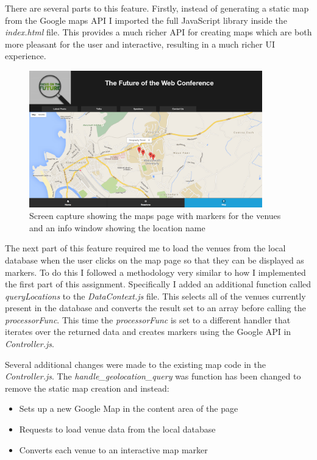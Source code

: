 \documentclass[paper=a4, fontsize=11pt]{scrartcl}	%
\numberwithin{equation}{section}															%
\numberwithin{figure}{section}																%
\numberwithin{table}{section}
\begin{document}
There are several parts to this feature. Firstly, instead of generating a static map from the Google maps API I imported the full JavaScript library inside the \textit{index.html} file. This provides a much richer API for creating maps which are both more pleasant for the user and interactive, resulting in a much richer UI experience.

\begin{figure}[H]
\centering
\includegraphics[width=0.9\textwidth]{google-maps.png}
\caption{Screen capture showing the maps page with markers for the venues and an info window showing the location name}
\label{fig:google-maps}
\end{figure}

The next part of this feature required me to load the venues from the local database when the user clicks on the map page so that they can be displayed as markers. To do this I followed a methodology very similar to how I implemented the first part of this assignment. Specifically I added an additional function called \textit{queryLocations} to the \textit{DataContext.js} file. This selects all of the venues currently present in the database and converts the result set to an array before calling the \textit{processorFunc}. This time the \textit{processorFunc} is set to a different handler that iterates over the returned data and creates markers using the Google API in \textit{Controller.js}.

Several additional changes were made to the existing map code in the \textit{Controller.js}. The \textit{handle\_geolocation\_query} was function has been changed to remove the static map creation and instead:

\begin{itemize}
	\item Sets up a new Google Map in the content area of the page
	\item Requests to load venue data from the local database
	\item Converts each venue to an interactive map marker
\end{itemize}
\end{document}
